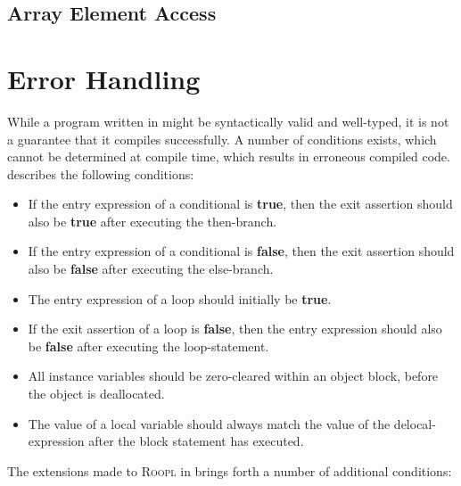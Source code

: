 \subsection{Array Element Access}
\label{subsec:array-element-access}


\section{Error Handling}
\label{sec:error-handling}

While a program written in \rooplpp might be syntactically valid and well-typed, it is not a guarantee that it compiles successfully. A number of conditions exists, which cannot be determined at compile time, which results in erroneous compiled code. \citeauthor{th:roopl} describes the following conditions:

\begin{itemize}
    \item If the entry expression of a conditional is \textbf{true}, then the exit assertion should also be \textbf{true} after executing the then-branch.
    \item If the entry expression of a conditional is \textbf{false}, then the exit assertion should also be \textbf{false} after executing the else-branch.
    \item The entry expression of a loop should initially be \textbf{true}.
    \item If the exit assertion of a loop is \textbf{false}, then the entry expression should also be \textbf{false} after executing the loop-statement.
    \item All instance variables should be zero-cleared within an object block, before the object is deallocated.
    \item The value of a local variable should always match the value of the delocal-expression after the block statement has executed.
\end{itemize}

The extensions made to \textsc{Roopl} in \rooplpp brings forth a number of additional conditions:

